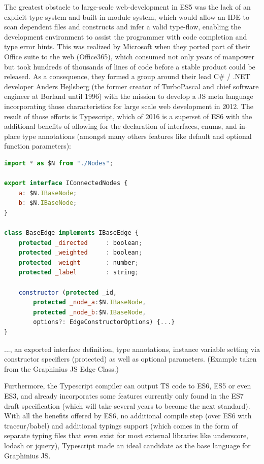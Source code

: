 	The greatest obstacle to large-scale web-development in ES5 was the lack of an explicit type system and built-in module system, which would allow an IDE to scan dependent files and constructs and infer a valid type-flow, enabling the development environment to assist the programmer with code completion and type error hints. This was realized by Microsoft when they ported part of their Office suite to the web (Office365), which consumed not only years of manpower but took hundreds of thousands of lines of code before a stable product could be released. As a consequence, they formed a group around their lead C\# / .NET developer Anders Hejlsberg (the former creator of TurboPascal and chief software engineer at Borland until 1996) with the mission to develop a JS meta language incorporating those characteristics for large scale web development in 2012. The result of those efforts is Typescript, which of 2016 is a superset of ES6 with the additional benefits of allowing for the declaration of interfaces, enums, and in-place type annotations (amongst many others features like default and optional function parameters): 
	
	\begin{lstlisting}[caption={Typescript sample featuring import of an external module.}, label={fig:TS example}, language=JavaScript]
import * as $N from "./Nodes";

export interface IConnectedNodes {
	a: $N.IBaseNode;
	b: $N.IBaseNode;
}

class BaseEdge implements IBaseEdge {
	protected _directed		: boolean;
	protected _weighted 	: boolean;
	protected _weight		: number;
	protected _label		: string;
	
	constructor (protected _id,
		protected _node_a:$N.IBaseNode,
		protected _node_b:$N.IBaseNode,
		options?: EdgeConstructorOptions) {...}
}	
	\end{lstlisting}
	\small
	..., an exported interface definition, type annotations, instance variable setting via constructor specifiers (protected) as well as optional parameters. (Example taken from the Graphinius JS Edge Class.)
	
	Furthermore, the Typescript compiler can output TS code to ES6, ES5 or even ES3, and already incorporates some features currently only found in the ES7 draft specification (which will take several years to become the next standard). With all the benefits offered by ES6, no additional compile step (over ES6 with traceur/babel) and additional typings support (which comes in the form of separate typing files that even exist for most external libraries like underscore, lodash or jquery), Typescript made an ideal candidate as the base language for Graphinius JS.
	

